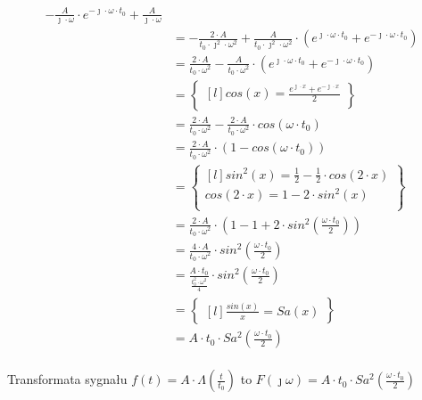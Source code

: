 \begin{task}
\begin{align*}
- \frac{A}{\jmath \cdot \omega} \cdot e^{ -\jmath \cdot \omega \cdot t_{0}} + \frac{A}{\jmath \cdot \omega}\\
&=- \frac{2 \cdot A}{t_{0} \cdot \jmath^{2} \cdot \omega^{2}} + \frac{A}{t_{0} \cdot \jmath^{2} \cdot \omega^{2}}  \cdot \left(e^{ \jmath \cdot \omega \cdot t_{0}}+e^{ -\jmath \cdot \omega \cdot t_{0}} \right)\\ %
&= \frac{2 \cdot A}{t_{0} \cdot \omega^{2}} - \frac{A}{t_{0} \cdot \omega^{2}} \cdot \left(e^{ \jmath \cdot \omega \cdot t_{0}}+e^{ -\jmath \cdot \omega \cdot t_{0}} \right)\\%
&=\begin{Bmatrix*}[l]%
cos(x)=\frac{e^{\jmath \cdot x} + e^{-\jmath \cdot x}}{2}\\
\end{Bmatrix*}\\
&= \frac{2 \cdot A}{t_{0} \cdot \omega^{2}} - \frac{2 \cdot A}{t_{0} \cdot \omega^{2}} \cdot cos(\omega \cdot t_{0})\\%
&= \frac{2 \cdot A}{t_{0} \cdot \omega^{2}} \cdot (1 - cos(\omega \cdot t_{0}))\\%
&=\begin{Bmatrix*}[l]%
sin^{2}(x)=\frac{1}{2}-\frac{1}{2}\cdot cos(2 \cdot x)\\
cos(2 \cdot x)= 1-2\cdot sin^{2}(x)\\
\end{Bmatrix*}\\
&= \frac{2 \cdot A}{t_{0} \cdot \omega^{2}} \cdot (1 - 1 + 2\cdot sin^{2}(\frac{\omega \cdot t_{0}}{2}))\\%
&= \frac{4 \cdot A}{t_{0} \cdot \omega^{2}} \cdot sin^{2}(\frac{\omega \cdot t_{0}}{2})\\%
&= \frac{A \cdot t_{0}}{\frac{t_{0}^{2} \cdot \omega^{2}}{4}} \cdot sin^{2}(\frac{\omega \cdot t_{0}}{2})\\%
&=\begin{Bmatrix*}[l]%
\frac{sin(x)}{x}=Sa(x)
\end{Bmatrix*}\\
&= A \cdot t_{0} \cdot Sa^{2}(\frac{\omega \cdot t_{0}}{2})\\%
\end{align*}

Transformata sygnału $f(t) = A \cdot \Lambda(\frac{t}{t_{0}})$ to $F(\jmath \omega)=A \cdot t_{0} \cdot Sa^{2}(\frac{\omega \cdot t_{0}}{2})$

\end{task}
